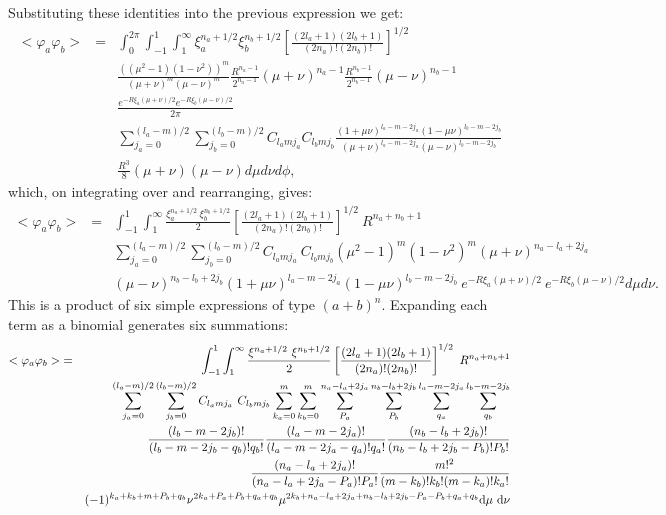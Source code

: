  Substituting these identities into the previous
expression we get:
\begin{eqnarray}
<\varphi _a\varphi _b>& =& \int _0^{2\pi }\int _{-1}^{1} \int _1^{\infty}
\xi_a ^{n_a+1/2}\xi_b^{n_b+1/2}\left [\frac{(2l_a+1)(2l_b+1)}{(2n_a)!(2n_b)!}\right ]
^{1/2} \nonumber \\
&&\frac{((\mu ^2-1)(1-\nu ^2))^m}{(\mu+\nu)^m(\mu-\nu)^m}
\frac{R^{n_a-1}}{2^{n_a-1}}(\mu+\nu)^{n_a-1}\frac{R^{n_b-1}}{2^{n_b-1}}(\mu-\nu)^{n_b-1}\nonumber \\ 
&&\frac{e^{-R\xi_a(\mu+\nu)/2}e^{-R\xi_b(\mu-\nu)/2}}{2\pi}
 \nonumber \\
&&\sum_{j_a=0}^{(l_a-m)/2}\sum_{j_b=0}^{(l_b-m)/2} 
C_{l_amj_a}C_{l_bmj_b}\frac{(1+\mu\nu)^{l_a-m-2j_a}(1-\mu\nu)^{l_b-m-2j_b}}
{(\mu+\nu)^{l_a-m-2j_a}(\mu-\nu)^{l_b-m-2j_b}} \nonumber \\&& 
\frac{R^3}{8}(\mu+\nu)(\mu-\nu)d\mu d\nu d\phi , \nonumber
\end{eqnarray}
which, on integrating over and rearranging, gives:
\begin{eqnarray}
<\varphi _a\varphi _b>& =& \int _{-1}^{1} \int _1^{\infty}
\frac{\xi_a ^{n_a+1/2}\ \xi_b^{n_b+1/2}}{2}\left [\frac{(2l_a+1)(2l_b+1)}{(2n_a)!(2n_b)!}\right ]
^{1/2}\ R^{n_a+n_b+1} \nonumber \\
&&\sum_{j_a=0}^{(l_a-m)/2}\sum_{j_b=0}^{(l_b-m)/2}
C_{l_amj_a}\ C_{l_bmj_b}(\mu^2-1)^m(1-\nu^2)^m(\mu+\nu)^{n_a-l_a+2j_a}\nonumber \\&&
(\mu-\nu)^{n_b-l_b+2j_b}(1+\mu\nu)^{l_a-m-2j_a}(1-\mu\nu)^{l_b-m-2j_b}
\ e^{-R\xi_a(\mu+\nu)/2}\ e^{-R\xi_b(\mu-\nu)/2}d\mu d\nu . \nonumber
\end{eqnarray}
This is a product of six simple expressions of type $(a+b)^n$. Expanding each term as a binomial generates six summations:
\begin{eqnarray}
<\varphi _a\varphi _b>& =& \int _{-1}^{1} \int _1^{\infty}
\frac{\xi ^{n_a+1/2}\ \xi^{n_b+1/2}}{2}\left [\frac{(2l_a+1)(2l_b+1)}{(2n_a)!(2n_b)!}\right ]
^{1/2}\ R^{n_a+n_b+1} \nonumber \\
&&\sum_{j_a=0}^{(l_a-m)/2}\sum_{j_b=0}^{(l_b-m)/2}
C_{l_amj_a}\ C_{l_bmj_b}\sum_{k_a=0}^m\sum_{k_b=0}^m
\sum_{P_a}^{n_a-l_a+2j_a}\sum_{P_b}^{n_b-l_b+2j_b}
\sum_{q_a}^{l_a-m-2j_a}\sum_{q_b}^{l_b-m-2j_b} \nonumber \\ &&
\frac{(l_b-m-2j_b)!}{(l_b-m-2j_b-q_b)!q_b!}
\frac{(l_a-m-2j_a)!}{(l_a-m-2j_a-q_a)!q_a!}
\frac{(n_b-l_b+2j_b)!}{(n_b-l_b+2j_b-P_b)!P_b!} \nonumber \\ &&
\frac{(n_a-l_a+2j_a)!}{(n_a-l_a+2j_a-P_a)!P_a!} 
\frac{m!^2}{(m-k_b)!k_b!(m-k_a)!k_a!}  \nonumber \\ &&
(-1)^{k_a+k_b+m+P_b+q_b}
\nu^{2k_a+P_a+P_b+q_a+q_b} 
\mu^{2k_b+n_a-l_a+2j_a+n_b-l_b+2j_b-P_a-P_b+q_a+q_b}{\rm d}\mu\ {\rm d}\nu
  \nonumber 
\end{eqnarray}


